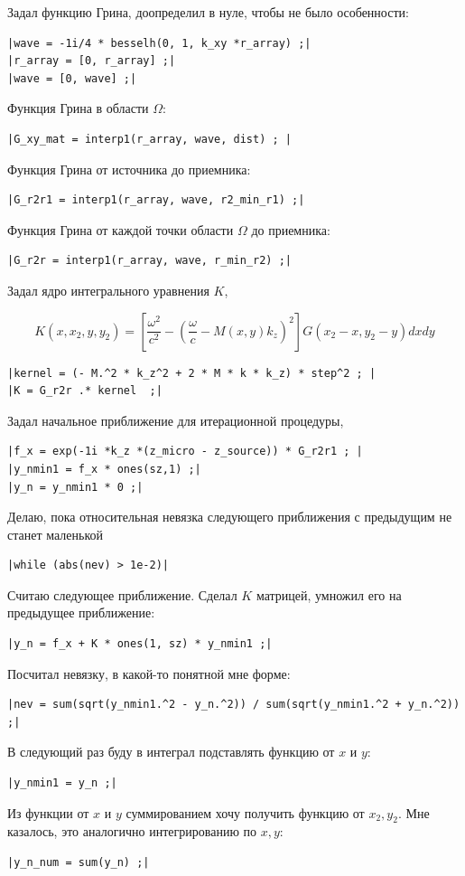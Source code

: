 \documentclass[a4paper,12pt,fleqn]{extreport} %
\begin{document}
Задал функцию Грина, доопределил в нуле, чтобы не было особенности:
\begin{verbatim}
|wave = -1i/4 * besselh(0, 1, k_xy *r_array) ;|
|r_array = [0, r_array] ;|
|wave = [0, wave] ;|
\end{verbatim}
Функция Грина в области $\Omega$:
\begin{verbatim}
|G_xy_mat = interp1(r_array, wave, dist) ; |
\end{verbatim}
Функция Грина от источника до приемника:
\begin{verbatim}
|G_r2r1 = interp1(r_array, wave, r2_min_r1) ;|
\end{verbatim}
Функция Грина от каждой точки области $\Omega$ до приемника:
\begin{verbatim}
|G_r2r = interp1(r_array, wave, r_min_r2) ;|
\end{verbatim}
Задал ядро интегрального уравнения $K$,

\begin{equation}
K(x,x_2,y,y_2) = \left[\frac{\omega^2}{c^2} - \left(\frac{\omega}{c} - M(x,y)k_z\right)^2\right] G(x_2-x, y_2-y) dx dy
\end{equation}
\begin{verbatim}
|kernel = (- M.^2 * k_z^2 + 2 * M * k * k_z) * step^2 ; |
|K = G_r2r .* kernel  ;|
\end{verbatim}
Задал начальное приближение для итерационной процедуры,
\begin{verbatim}
|f_x = exp(-1i *k_z *(z_micro - z_source)) * G_r2r1 ; |
|y_nmin1 = f_x * ones(sz,1) ;|
|y_n = y_nmin1 * 0 ;|
\end{verbatim}
Делаю, пока относительная невязка следующего приближения с предыдущим не станет маленькой
\begin{verbatim}
|while (abs(nev) > 1e-2)|
\end{verbatim}
Считаю следующее приближение. Сделал $K$ матрицей, умножил его на предыдущее приближение:
\begin{verbatim}
|y_n = f_x + K * ones(1, sz) * y_nmin1 ;|
\end{verbatim}
Посчитал невязку, в какой-то понятной мне форме:
\begin{verbatim}
|nev = sum(sqrt(y_nmin1.^2 - y_n.^2)) / sum(sqrt(y_nmin1.^2 + y_n.^2)) ;|
\end{verbatim}
В следующий раз буду в интеграл подставлять функцию от $x$ и $y$:
\begin{verbatim}
|y_nmin1 = y_n ;|
\end{verbatim}
Из функции от $x$ и $y$ суммированием хочу получить функцию от $x_2, y_2$. Мне казалось, это аналогично интегрированию по $x,y$:
\begin{verbatim}
|y_n_num = sum(y_n) ;|
\end{verbatim}
\end{document}

